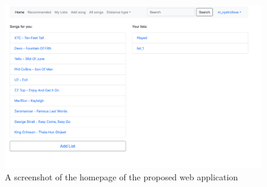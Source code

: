 \begin{figure}[H]
    \centering
	\includegraphics[width=1\linewidth]{./img/home_page.png}
	\caption{A screenshot of the homepage of the proposed web application}
	\label{fig:home_page}
\end{figure}


